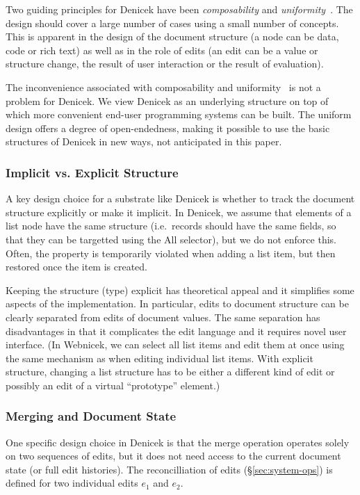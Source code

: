 \documentclass[sigconf,anonymous,screen]{acmart}
\newcommand{\ident}[1]{{\sffamily #1}}
\begin{document}
Two guiding principles for Denicek have been \emph{composability} and
\emph{uniformity}~\cite{jakubovic-2023-techdims}. The design should cover a large number of
cases using a small number of concepts. This is apparent in the design of the document
structure (a node can be data, code or rich text) as well as in the role of edits
(an edit can be a value or structure change, the result of user interaction or the
result of evaluation).

The inconvenience associated with composability and uniformity~\cite{jakubovic-2023-techdims} is not
a problem for Denicek. We view Denicek as an underlying structure on top of which more
convenient end-user programming systems can be built. The uniform design offers a degree of open-endedness,
making it possible to use the basic structures of Denicek in new ways, not anticipated in this paper.

\subsubsection*{Implicit vs. Explicit Structure}
A key design choice for a substrate like Denicek is whether to track the document structure
explicitly or make it implicit. In Denicek, we assume that elements of a list node have the same
structure (i.e.~records should have the same fields, so that they can be targetted using the \ident{All}
selector), but we do not enforce this. Often, the property is temporarily violated when adding a
list item, but then restored once the item is created.

Keeping the structure (type) explicit has theoretical appeal and it simplifies some
aspects of the implementation. In particular, edits to document structure can be clearly separated
from edits of document values. The same separation has disadvantages in that it complicates the
edit language and it requires novel user interface. (In Webnicek, we can select all list items
and edit them at once using the same mechanism as when editing individual list items. With explicit
structure, changing a list structure has to be either a different kind of edit or possibly an edit
of a virtual ``prototype'' element.)

\subsubsection*{Merging and Document State}
One specific design choice in Denicek is that the merge operation operates solely on two
sequences of edits, but it does not need access to the current document state (or full edit
histories). The reconcilliation of edits (\S\ref{sec:system-ops}) is defined for two individual
edits $e_1$ and $e_2$.
\end{document}
